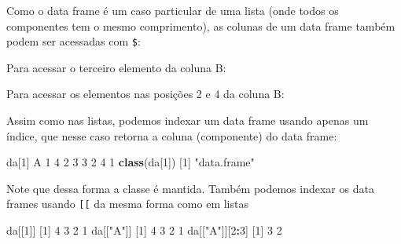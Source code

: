 \documentclass[10pt,a4paper]{book}
\newenvironment{Shaded}{\begin{snugshade}}{\end{snugshade}}
\newcommand{\KeywordTok}[1]{\textcolor[rgb]{0.13,0.29,0.53}{\textbf{#1}}}
\newcommand{\DecValTok}[1]{\textcolor[rgb]{0.00,0.00,0.81}{#1}}
\newcommand{\StringTok}[1]{\textcolor[rgb]{0.31,0.60,0.02}{#1}}
\newcommand{\OtherTok}[1]{\textcolor[rgb]{0.56,0.35,0.01}{#1}}
\newcommand{\OperatorTok}[1]{\textcolor[rgb]{0.81,0.36,0.00}{\textbf{#1}}}
\newcommand{\NormalTok}[1]{#1}
\begin{document}
Como o data frame é um caso particular de uma lista (onde todos os
componentes tem o mesmo comprimento), as colunas de um data frame também
podem ser acessadas com \texttt{\$}:

\begin{Shaded}
\end{Shaded}

Para acessar o terceiro elemento da coluna B:

\begin{Shaded}
\end{Shaded}

Para acessar os elementos nas posições 2 e 4 da coluna B:

\begin{Shaded}
\end{Shaded}

Assim como nas listas, podemos indexar um data frame usando apenas um
índice, que nesse caso retorna a coluna (componente) do data frame:

\begin{Shaded}
\begin{Highlighting}[]
\NormalTok{da[}\DecValTok{1}\NormalTok{]}
\NormalTok{  A}
\DecValTok{1} \DecValTok{4}
\DecValTok{2} \DecValTok{3}
\DecValTok{3} \DecValTok{2}
\DecValTok{4} \DecValTok{1}
\KeywordTok{class}\NormalTok{(da[}\DecValTok{1}\NormalTok{])}
\NormalTok{[}\DecValTok{1}\NormalTok{] }\StringTok{"data.frame"}
\end{Highlighting}
\end{Shaded}

Note que dessa forma a classe é mantida. Também podemos indexar os data
frames usando \texttt{{[}{[}} da mesma forma como em listas

\begin{Shaded}
\begin{Highlighting}[]
\NormalTok{da[[}\DecValTok{1}\NormalTok{]]}
\NormalTok{[}\DecValTok{1}\NormalTok{] }\DecValTok{4} \DecValTok{3} \DecValTok{2} \DecValTok{1}
\NormalTok{da[[}\StringTok{"A"}\NormalTok{]]}
\NormalTok{[}\DecValTok{1}\NormalTok{] }\DecValTok{4} \DecValTok{3} \DecValTok{2} \DecValTok{1}
\NormalTok{da[[}\StringTok{"A"}\NormalTok{]][}\DecValTok{2}\OperatorTok{:}\DecValTok{3}\NormalTok{]}
\NormalTok{[}\DecValTok{1}\NormalTok{] }\DecValTok{3} \DecValTok{2}
\end{Highlighting}
\end{Shaded}
\end{document}
